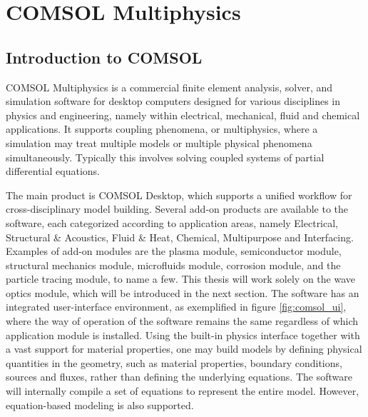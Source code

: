 \chapter{COMSOL Multiphysics}
\section{Introduction to COMSOL}
COMSOL Multiphysics is a commercial finite element analysis, solver, and simulation software for desktop computers designed for various disciplines in physics and engineering, namely within electrical, mechanical, fluid and chemical applications. It supports coupling phenomena, or multiphysics, where a simulation may treat multiple models or multiple physical phenomena simultaneously. Typically this involves solving coupled systems of partial differential equations. 

The main product is COMSOL Desktop, which supports a unified workflow for cross-disciplinary model building. Several add-on products are available to the software, each categorized according to application areas, namely Electrical, Structural \& Acoustics, Fluid \& Heat, Chemical, Multipurpose and Interfacing. Examples of add-on modules are the plasma module, semiconductor module, structural mechanics module, microfluids module, corrosion module, and the particle tracing module, to name a few\cite{comsol_referencemanual}. This thesis will work solely on the wave optics module, which will be introduced in the next section. The software has an integrated user-interface environment, as exemplified in figure \ref{fig:comsol_ui}, where the way of operation of the software remains the same regardless of which application module is installed. Using the built-in physics interface together with a vast support for material properties, one may build models by defining physical quantities in the geometry, such as material properties, boundary conditions, sources and fluxes, rather than defining the underlying equations. The software will internally compile a set of equations to represent the entire model. However, equation-based modeling is also supported\cite{comsol_referencemanual}.

